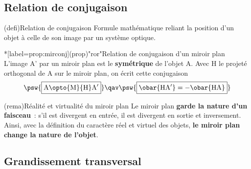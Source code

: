\documentclass[../../main/main.tex]{subfiles}
\begin{document}
\subsection{Relation de conjugaison}


\begin{tcb}[label=def:relconj](defi){Relation de conjugaison}
	Formule mathématique reliant la position d'un objet à celle de son image
	par un système optique.
\end{tcb}
\begin{tcb}*[label=prop:mirconj](prop)"ror"{Relation de conjugaison d'un miroir plan}
	L'image A' par un miroir plan est le \textbf{symétrique} de l'objet
	A. Avec H le projeté orthogonal de A sur le miroir plan, on écrit
	cette conjugaison
	\[
		\psw{
			\boxed{\rm A \opto{\rm M}{\rm H} A'}
		}
		\qav
		\psw{
			\boxed{\obar{\rm HA'} = -\obar{\rm HA}}
		}
	\]
\end{tcb}
\begin{tcb}[label=rema:mirrv](rema){Réalité et virtualité du miroir plan}
	Le miroir plan \textbf{garde la nature d'un faisceau}~: s'il est divergent en
	entrée, il est divergent en sortie et inversement. Ainsi, avec la définition
	du caractère réel et virtuel des objets, \textbf{le miroir plan change la
		nature de l'objet}.
\end{tcb}

\subsection{Grandissement transversal}
\end{document}

